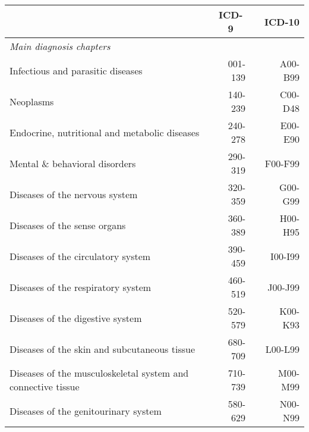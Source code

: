\documentclass{scrartcl} %
\begin{document}
\begin{table}[h]
\begin{threeparttable}
\begin{tabular}{lrrr}
&\multicolumn{1}{c}{ICD-9} & & \multicolumn{1}{c}{ICD-10} \\ 
\midrule
\textit{Main diagnosis chapters}\\
 \hspace{4pt} Infectious and parasitic diseases                           	&	001-139		& &		A00-B99 \\
 \hspace{4pt} Neoplasms                                                   	&	140-239		& &		C00-D48 \\
 \hspace{4pt} Endocrine, nutritional and metabolic diseases					&	240-278		& &		E00-E90 \\
 \hspace{4pt} Mental \& behavioral  disorders                             	&	290-319		& &		F00-F99 \\
 \hspace{4pt} Diseases of the nervous system                              	&	320-359		& &		G00-G99 \\
 \hspace{4pt} Diseases of the sense organs                                	&	360-389		& &		H00-H95 \\
 \hspace{4pt} Diseases of the circulatory system                          	&	390-459		& &		I00-I99 \\
 \hspace{4pt} Diseases of the respiratory system                          	&	460-519		& &		J00-J99 \\
 \hspace{4pt} Diseases of the digestive system                            	&	520-579		& &		K00-K93 \\
 \hspace{4pt} Diseases of the skin and subcutaneous tissue                	&	680-709		& &		L00-L99 \\
 \hspace{4pt} Diseases of the musculoskeletal system and connective tissue	&	710-739		& &		M00-M99 \\
 \hspace{4pt} Diseases of the genitourinary system                        	&	580-629		& &		N00-N99 \\

\end{tabular}
\end{threeparttable}
\end{table}
\end{document}
